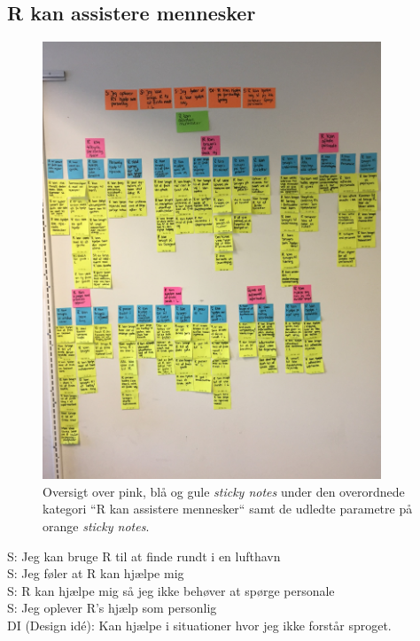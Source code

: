 \subsection{R kan assistere mennesker}
%
\begin{figure}[H]
\centering
\includegraphics[width = 0.9\textwidth]{Figure/AffinityDiagram/RKanAssistereMennesker} 
\caption{Oversigt over pink, blå og gule \textit{sticky notes} under den overordnede kategori ``R kan assistere mennesker`` samt de udledte parametre på orange \textit{sticky notes}.}
\label{fig:AFRKanAssistereMennesker}
\end{figure}
\noindent
%
S: Jeg kan bruge R til at finde rundt i en lufthavn\\
S: Jeg føler at R kan hjælpe mig\\
S: R kan hjælpe mig så jeg ikke behøver at spørge personale\\
S: Jeg oplever R's hjælp som personlig\\
DI (Design idé): Kan hjælpe i situationer hvor jeg ikke forstår sproget. 

